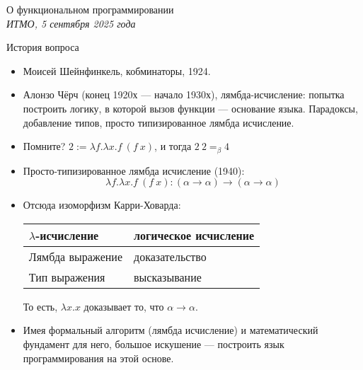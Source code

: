 \documentclass[aspectratio=169]{beamer}
\begin{document}
\newtheorem{axiom}{Аксиома}
\newtheorem{exmprus}{Пример}
\newtheorem{defrus}{Определение}
\newtheorem{lemmarus}{Лемма}
\newtheorem{thmrus}{Лемма}

\begin{frame}{}
\begin{center}{\Large О функциональном программировании}\\\itshape{ИТМО, 5 сентября 2025 года}\end{center}
\end{frame}

\begin{frame}{История вопроса}
\begin{itemize}
\item Моисей Шейнфинкель, кобминаторы, 1924.

\item Алонзо Чёрч (конец 1920х --- начало 1930х), лямбда-исчисление: попытка построить логику,
в которой вызов функции --- основание языка.
Парадоксы, добавление типов, просто типизированное лямбда исчисление.

\item Помните? $2 := \lambda f.\lambda x.f\ (f\ x)$, и тогда $2\ 2 =_\beta 4$

\item Просто-типизированное лямбда исчисление (1940):
 $$\lambda f.\lambda x.f\ (f\ x): (\alpha\rightarrow\alpha) \rightarrow (\alpha\rightarrow\alpha)$$

\item Отсюда изоморфизм Карри-Ховарда:
\begin{tabular}{ll}
$\lambda$-исчисление & логическое исчисление\\\hline
Лямбда выражение & доказательство\\
Тип выражения & высказывание
\end{tabular}

То есть, $\lambda x.x$ доказывает то, что $\alpha\rightarrow\alpha$.

\item Имея формальный алгоритм (лямбда исчисление) и математический фундамент для него,
большое искушение --- построить язык программирования на этой основе.
\end{itemize}
\end{frame}
\end{document}
